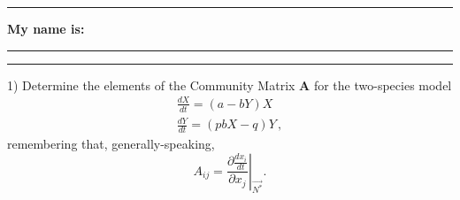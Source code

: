 \documentclass{article}
\newcommand*{\blanks}[1][4em]{\rule{#1}{.4pt}}
\begin{document}
\noindent{}

\rule[0.5ex]{\linewidth}{1pt}
\begin{center}
	\textbf{My name is:} \blanks[150pt]
\end{center}
\rule[0.5ex]{\linewidth}{1pt}

1) Determine the elements of the Community Matrix $\textbf{A}$ for the  two-species model
	\begin{align*}
		\frac{dX}{dt} = (a-bY) X \\
		\frac{dY}{dt} = (pbX - q) Y \, ,
	\end{align*}
remembering that, generally-speaking, 
	\begin{equation*}
		A_{ij} = \left . \frac{ \partial \frac{dx_i}{dt} }{\partial x_j} \right \vert_{\vec{N^*}}.
	\end{equation*}
\end{document}
